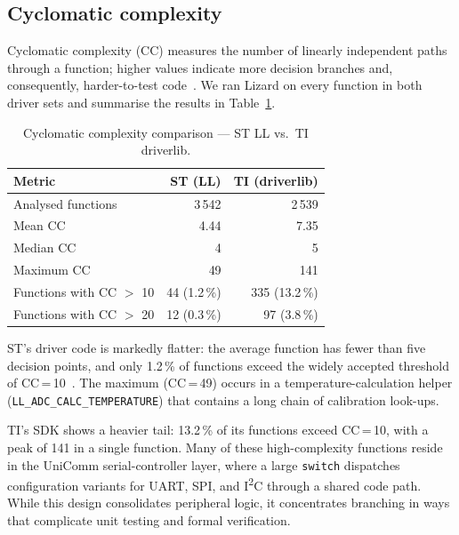 \subsection{Cyclomatic complexity}
\label{subsec:ti-complexity}

Cyclomatic complexity (CC) measures the number of linearly independent paths through a
function; higher values indicate more decision branches and, consequently, harder-to-test
code~\cite{lizard-tool}. We ran Lizard on every function in both driver sets and
summarise the results in Table~\ref{tab:ti-complexity}.

\begin{table}[H]
\centering
\caption{Cyclomatic complexity comparison --- ST LL vs.\ TI driverlib.}
\label{tab:ti-complexity}
\begin{tabular}{l r r}
\toprule
\textbf{Metric} & \textbf{ST (LL)} & \textbf{TI (driverlib)} \\
\midrule
Analysed functions       &    3\,542 &    2\,539 \\
Mean CC                  &      4.44 &      7.35 \\
Median CC                &         4 &         5 \\
Maximum CC               &        49 &       141 \\
\midrule
Functions with CC $>$ 10 &    44 \scriptsize(1.2\,\%) &   335 \scriptsize(13.2\,\%) \\
Functions with CC $>$ 20 &    12 \scriptsize(0.3\,\%) &    97 \scriptsize(3.8\,\%) \\
\bottomrule
\end{tabular}
\end{table}

ST's driver code is markedly flatter: the average function has fewer than five decision
points, and only 1.2\,\% of functions exceed the widely accepted threshold of
CC\,=\,10~\cite{misra-c2012}. The maximum (CC\,=\,49) occurs in a temperature-calculation
helper (\texttt{LL\_ADC\_CALC\_TEMPERATURE}) that contains a long chain of calibration
look-ups.

TI's SDK shows a heavier tail: 13.2\,\% of its functions exceed CC\,=\,10, with a peak of
141 in a single function. Many of these high-complexity functions reside in the UniComm
serial-controller layer, where a large \texttt{switch} dispatches configuration variants
for UART, SPI, and I\textsuperscript{2}C through a shared code path. While this design
consolidates peripheral logic, it concentrates branching in ways that complicate unit testing
and formal verification.

